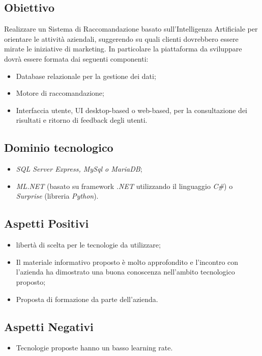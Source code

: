 \documentclass{article}
\begin{document}
\subsection{Obiettivo}
Realizzare un Sistema di Raccomandazione basato sull'Intelligenza Artificiale per orientare le attività aziendali, suggerendo su quali clienti dovrebbero essere mirate le iniziative di marketing.
In particolare la piattaforma da sviluppare dovrà essere formata dai seguenti componenti:

\begin{itemize}
    \item Database relazionale per la gestione dei dati;
    \item Motore di raccomandazione;
    \item Interfaccia utente, UI desktop-based o web-based, per la consultazione dei risultati e ritorno di feedback degli utenti.
\end{itemize}

\subsection{Dominio tecnologico}
\begin{itemize}
    \item \textit{SQL Server Express, MySql o MariaDB};
    \item \textit{ML.NET} (basato su framework \textit{.NET} utilizzando il linguaggio \textit{C\#}) o \textit{Surprise} (libreria \textit{Python}).
\end{itemize}

\subsection{Aspetti Positivi}
\begin{itemize}
    \item libertà di scelta per le tecnologie da utilizzare;
    \item Il materiale informativo proposto è molto approfondito e l’incontro con l’azienda ha dimostrato una buona conoscenza nell’ambito tecnologico proposto;
    \item Proposta di formazione da parte dell’azienda.
\end{itemize}

\subsection{Aspetti Negativi}
\begin{itemize}
    \item Tecnologie proposte hanno un basso learning rate.
\end{itemize}
\end{document}
